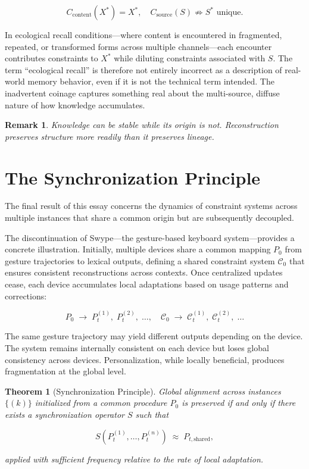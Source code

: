 \documentclass[12pt, letterpaper]{article}
\theoremstyle{flyxion}
\newtheorem{theorem}{Theorem}
\newtheorem*{remark}{Remark}
\begin{document}
\begin{equation}
C_\mathrm{content}(X^*) = X^*, \quad C_\mathrm{source}(S) \not\Rightarrow S^* \text{ unique}.
\end{equation}

In ecological recall conditions---where content is encountered in fragmented, repeated, or transformed forms across multiple channels---each encounter contributes constraints to $X^*$ while diluting constraints associated with $S$. The term ``ecological recall'' is therefore not entirely incorrect as a description of real-world memory behavior, even if it is not the technical term intended. The inadvertent coinage captures something real about the multi-source, diffuse nature of how knowledge accumulates.

\begin{remark}
Knowledge can be stable while its origin is not. Reconstruction preserves structure more readily than it preserves lineage.
\end{remark}

\section{The Synchronization Principle}

The final result of this essay concerns the dynamics of constraint systems across multiple instances that share a common origin but are subsequently decoupled.

The discontinuation of Swype---the gesture-based keyboard system---provides a concrete illustration. Initially, multiple devices share a common mapping $P_0$ from gesture trajectories to lexical outputs, defining a shared constraint system $\mathcal{C}_0$ that ensures consistent reconstructions across contexts. Once centralized updates cease, each device accumulates local adaptations based on usage patterns and corrections:

\begin{equation}
P_0 \;\to\; P_t^{(1)},\; P_t^{(2)},\; \dots,\quad \mathcal{C}_0 \;\to\; \mathcal{C}_t^{(1)},\; \mathcal{C}_t^{(2)},\; \dots
\end{equation}

The same gesture trajectory may yield different outputs depending on the device. The system remains internally consistent on each device but loses global consistency across devices. Personalization, while locally beneficial, produces fragmentation at the global level.

\begin{theorem}[Synchronization Principle]
Global alignment across instances $\{(k)\}$ initialized from a common procedure $P_0$ is preserved if and only if there exists a synchronization operator $S$ such that

\begin{equation}
S\!\left(P_t^{(1)}, \dots, P_t^{(n)}\right) \;\approx\; P_{t,\mathrm{shared}},
\end{equation}

applied with sufficient frequency relative to the rate of local adaptation.
\end{theorem}
\end{document}
